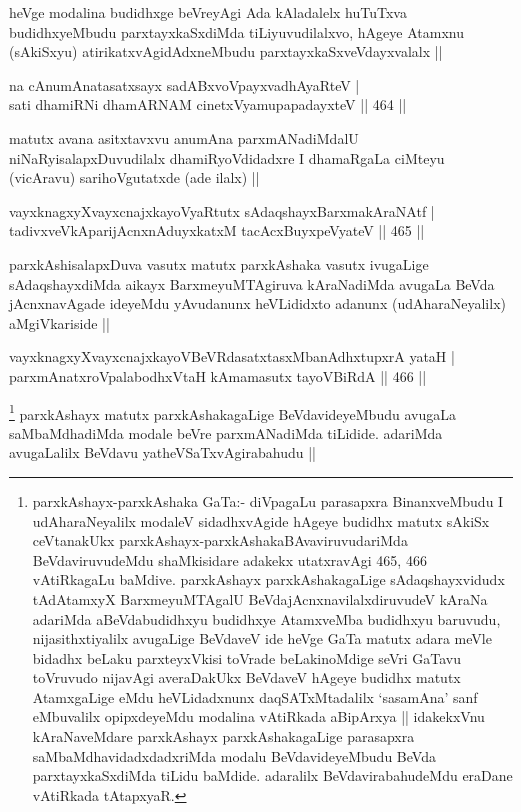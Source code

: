 \begin{artha}
heVge modalina budidhxge beVreyAgi Ada kAladalelx huTuTxva budidhxyeMbudu parxtayxkaSxdiMda tiLiyuvudilalxvo, hAgeye Atamxnu (sAkiSxyu) atirikatxvAgidAdxneMbudu parxtayxkaSxveVdayxvalalx ||
\end{artha}

\begin{shl}
na cAnumAnatasatxsayx sadABxvoV\s payxvadhAyaRteV | \\
sati dhamiRNi dhamARNAM cinetxVyamupapadayxteV \hfill||  464 ||  
\end{shl}

\begin{artha}
matutx avana asitxtavxvu anumAna parxmANadiMdalU niNaRyisalapxDuvudilalx dhamiRyoVdidadxre I dhamaRgaLa ciMteyu (vicAravu) sarihoVgutatxde (ade ilalx) ||
\end{artha}

\begin{shl}
vayxknagxyXvayxcnajxkayoVyaRtutx sAdaqshayxBarxmakAraNAtf | \\
tadivxveVkAparijAcnxnAduyxkatxM tacAcxBuyxpeVyateV \hfill||  465 ||  
\end{shl}

\begin{artha}
parxkAshisalapxDuva vasutx matutx parxkAshaka vasutx ivugaLige sAdaqshayxdiMda aikayx BarxmeyuMTAgiruva kAraNadiMda avugaLa BeVda jAcnxnavAgade ideyeMdu yAvudanunx heVLididxto adanunx (udAharaNeyalilx) aMgiVkariside ||
\end{artha}


\begin{shl}
vayxknagxyXvayxcnajxkayoVBeVRdasatxtasxMbanAdhxtupxrA yataH | \\
parxmAnatxroVpalabodhxV\s taH kAmamasutx tayoVBiRdA \hfill||  466 ||  
\end{shl}

\begin{artha}
\footnote{parxkAshayx-parxkAshaka GaTa:- diVpagaLu parasapxra BinanxveMbudu I udAharaNeyalilx modaleV sidadhxvAgide hAgeye budidhx matutx sAkiSx ceVtanakUkx parxkAshayx-parxkAshakaBAvaviruvudariMda BeVdaviruvudeMdu shaMkisidare adakekx utatxravAgi 465, 466 vAtiRkagaLu baMdive. parxkAshayx parxkAshakagaLige sAdaqshayxvidudx tAdAtamxyX BarxmeyuMTAgalU BeVdajAcnxnavilalxdiruvudeV kAraNa adariMda aBeVdabudidhxyu budidhxye AtamxveMba budidhxyu baruvudu, nijasithxtiyalilx avugaLige BeVdaveV ide heVge GaTa matutx adara meVle bidadhx beLaku parxteyxVkisi toVrade beLakinoMdige seVri GaTavu toVruvudo nijavAgi averaDakUkx BeVdaveV hAgeye budidhx matutx AtamxgaLige eMdu heVLidadxnunx daqSATxMtadalilx `sasamAna' sanf eMbuvalilx opipxdeyeMdu modalina vAtiRkada aBipArxya || idakekxVnu kAraNaveMdare parxkAshayx parxkAshakagaLige parasapxra saMbaMdhavidadxdadxriMda modalu BeVdavideyeMbudu BeVda parxtayxkaSxdiMda tiLidu baMdide. adaralilx BeVdavirabahudeMdu eraDane vAtiRkada tAtapxyaR.} parxkAshayx matutx parxkAshakagaLige BeVdavideyeMbudu avugaLa saMbaMdhadiMda modale beVre parxmANadiMda tiLidide. adariMda avugaLalilx BeVdavu yatheVSaTxvAgirabahudu ||
\end{artha}

